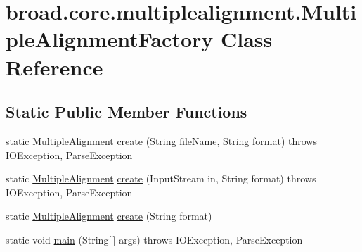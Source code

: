 \hypertarget{classbroad_1_1core_1_1multiplealignment_1_1_multiple_alignment_factory}{\section{broad.\+core.\+multiplealignment.\+Multiple\+Alignment\+Factory Class Reference}
\label{classbroad_1_1core_1_1multiplealignment_1_1_multiple_alignment_factory}
}
\subsection*{Static Public Member Functions}
\begin{DoxyCompactItemize}
\item 
static \hyperlink{classbroad_1_1core_1_1multiplealignment_1_1_multiple_alignment}{Multiple\+Alignment} \hyperlink{classbroad_1_1core_1_1multiplealignment_1_1_multiple_alignment_factory_a26e405bcffaf82da06425337559aff3c}{create} (String file\+Name, String format)  throws I\+O\+Exception, Parse\+Exception 
\item 
static \hyperlink{classbroad_1_1core_1_1multiplealignment_1_1_multiple_alignment}{Multiple\+Alignment} \hyperlink{classbroad_1_1core_1_1multiplealignment_1_1_multiple_alignment_factory_a524e57be3c7f25f3d1c96f6cca1cbf38}{create} (Input\+Stream in, String format)  throws I\+O\+Exception, Parse\+Exception 
\item 
static \hyperlink{classbroad_1_1core_1_1multiplealignment_1_1_multiple_alignment}{Multiple\+Alignment} \hyperlink{classbroad_1_1core_1_1multiplealignment_1_1_multiple_alignment_factory_af8089270a8d570a1d60ee16701ad5fbe}{create} (String format)
\item 
static void \hyperlink{classbroad_1_1core_1_1multiplealignment_1_1_multiple_alignment_factory_a2b51e98b62505bde099c60d1a0e77427}{main} (String\mbox{[}$\,$\mbox{]} args)  throws I\+O\+Exception, Parse\+Exception 
\end{DoxyCompactItemize}


